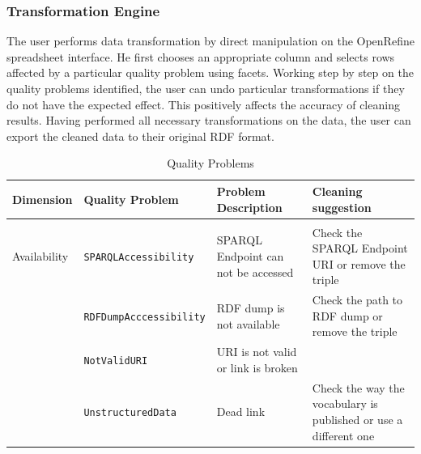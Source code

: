\subsubsection{Transformation Engine}
The user performs data transformation by direct manipulation on the OpenRefine spreadsheet interface. 
He first chooses an appropriate column and selects rows affected by a particular quality problem using facets. 
Working step by step on the quality problems identified, the user can undo particular transformations if they do not have the expected effect.
This positively affects the accuracy of cleaning results.
Having performed all necessary transformations on the data, the user can export the cleaned data to their original RDF format.
\begin{table}[t]
\caption{Quality Problems}
\label{tab:qualityProblems}
\begin{center}
\begin{tabular}{p{}p{}p{}p{}}                                                                                                                                           \\ 
\bf{Dimension} & \bf{Quality Problem}                    & \bf{Problem Description}                                             & \bf{Cleaning suggestion}                                                              \\ \hline \\
Availability   & \texttt{SPARQLAccessibility}            & SPARQL Endpoint can not be accessed                                  & Check the SPARQL Endpoint URI or remove the triple                                    \\
               & \texttt{RDFDumpAcccessibility}          & RDF dump is not available                                            & Check the path to RDF dump or remove the triple                                       \\
               & \texttt{NotValidURI}                    & URI is not valid or link is broken                                   &                                                                                       \\
               & \texttt{UnstructuredData}               & Dead link                                                            & Check the way the vocabulary is published or use a different one                      \\

\end{tabular}
\end{center}
\end{table}
